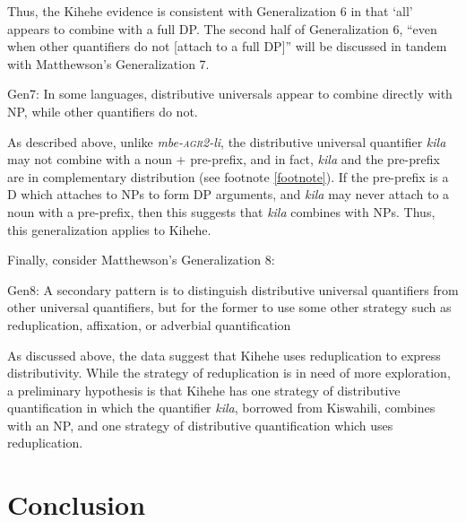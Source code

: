 \documentclass[letterpaper, 12pt]{article}
\begin{document}
Thus, the Kihehe evidence is consistent with Generalization 6 in that `all' appears to combine with a full DP.  The second half of Generalization 6, ``even when other quantifiers do not [attach to a full DP]'' will be discussed in tandem with Matthewson's Generalization 7. 


\begin{exe}
\singlespacing
\ex Gen7: In some languages, distributive universals appear to combine directly with NP, while other quantifiers do not. \cite[p. 36]{matthewson13} \\
\end{exe}

As described above, unlike \textit{mbe-\textsc{agr2}-li}, the distributive universal quantifier \textit{kila} may not combine with a noun + pre-prefix, and in fact, \textit{kila} and the pre-prefix are in complementary distribution (see footnote \ref{footnote}). If the pre-prefix is a D which attaches to NPs to form DP arguments, and \textit{kila} may never attach to a noun with a pre-prefix, then this suggests that \textit{kila} combines with NPs. Thus, this generalization applies to Kihehe. 

Finally, consider Matthewson's Generalization 8: 

\begin{exe}
\singlespacing
\ex Gen8: A secondary pattern is to distinguish distributive universal quantifiers from other universal quantifiers, but for the former to use some other strategy such as reduplication, affixation, or adverbial quantification \cite[p. 37]{matthewson13} \\
\end{exe}

As discussed above, the data suggest that Kihehe uses reduplication to express distributivity.  While the strategy of reduplication is in need of more exploration, a preliminary hypothesis is that Kihehe has one strategy of distributive quantification in which the quantifier \textit{kila}, borrowed from Kiswahili, combines with an NP, and one strategy of distributive quantification which uses reduplication. 



\section{Conclusion}
\end{document}
